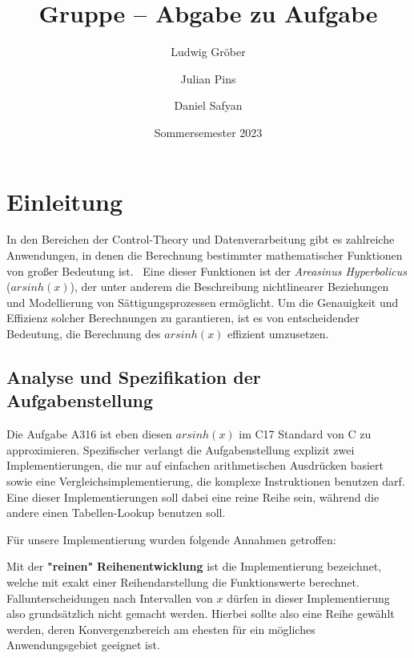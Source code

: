 \documentclass[course=erap] {aspdoc}
\author{Ludwig Gröber \and Julian Pins \and Daniel Safyan}
\date{Sommersemester 2023} %
\title{Gruppe \theGroup{} -- Abgabe zu Aufgabe \theNumber}
\begin{document}
    \maketitle


    \section{Einleitung}
    In den Bereichen der Control-Theory und Datenverarbeitung gibt es zahlreiche Anwendungen, in denen die Berechnung bestimmter mathematischer Funktionen von großer Bedeutung ist.~\cite{QUELLE_DANIEL}
    Eine dieser Funktionen ist der \textit{Areasinus Hyperbolicus} ($arsinh(x)$), der unter anderem die Beschreibung nichtlinearer Beziehungen und Modellierung von Sättigungsprozessen ermöglicht.
    Um die Genauigkeit und Effizienz solcher Berechnungen zu garantieren, ist es von entscheidender Bedeutung, die Berechnung des $arsinh(x)$ effizient umzusetzen.
    

    \subsection{Analyse und Spezifikation der Aufgabenstellung}
    Die Aufgabe A316 ist eben diesen $arsinh(x)$ im C17 Standard von C zu approximieren.
    Spezifischer verlangt die Aufgabenstellung explizit zwei Implementierungen, die nur auf einfachen arithmetischen Ausdrücken basiert sowie eine Vergleichsimplementierung, die komplexe Instruktionen benutzen darf.
    Eine dieser Implementierungen soll dabei eine reine Reihe sein, während die andere einen Tabellen-Lookup benutzen soll.

    Für unsere Implementierung wurden folgende Annahmen getroffen:


    Mit der \textbf{"reinen"} \textbf{Reihenentwicklung} ist die Implementierung bezeichnet, welche mit exakt einer Reihendarstellung die Funktionswerte berechnet.
    Fallunterscheidungen nach Intervallen von $x$ dürfen in dieser Implementierung also grundsätzlich nicht gemacht werden.
    Hierbei sollte also eine Reihe gewählt werden, deren Konvergenzbereich am ehesten für ein mögliches Anwendungsgebiet geeignet ist.
\end{document}
